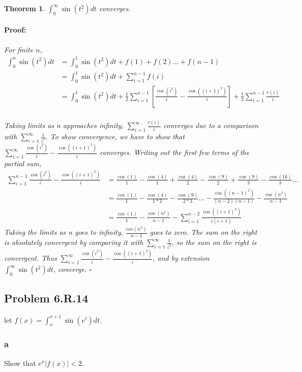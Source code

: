 \documentclass{article}
\newenvironment{proof}{\paragraph{Proof:}}{\hfill$\square$}
\newtheorem{theorem}{Theorem}
\begin{document}
\begin{theorem}
$\int_0^\infty \sin(t^2)dt$ converges.

\begin{proof}
For finite $n$,
\begin{align*}
\int_0^n \sin(t^2)dt &= \int_0^1 \sin(t^2)dt + f(1) + f(2) \dots + f(n-1) \\
&= \int_0^1 \sin(t^2)dt + \sum_{i=1}^{n-1}f(i) \\
&= \int_0^1 \sin(t^2)dt + \frac{1}{2}\sum_{i=1}^{n-1}\left[
\frac{\cos(i^2)}{i} - \frac{\cos\left((i+1)^2\right)}{i} \right]
+ \frac{1}{2}\sum_{i=1}^{n-1} \frac{r(i)}{i}
 \\
\end{align*}

Taking limits as n approaches infinity, $\sum_{i=1}^\infty \frac{r(i)}{i}$ converges due to a comparison with $\sum_{i=1}^\infty \frac{1}{i^2}$. To show convergence, we have to show that $\sum_{i=1}^{\infty}\frac{\cos(i^2)}{i} - \frac{\cos\left((i+1)^2\right)}{i}$ converges. Writing out the first few terms of the partial sum,
\begin{align*}
\sum_{i=1}^{n-1} \frac{\cos(i^2)}{i} - \frac{\cos\left((i+1)^2\right)}{i}
&= \frac{\cos(1)}{1} - \frac{\cos(4)}{1} + \frac{\cos(4)}{2} - \frac{\cos(9)}{2} + \frac{\cos(9)}{3} - \frac{\cos(16)}{3} \dots \\
&= \frac{\cos(1)}{1} - \frac{\cos(4)}{1*2} - \frac{\cos(9)}{2*3} \dots
- \frac{\cos\left((n-1)^2\right)}{(n-2)(n-1)} - \frac{\cos(n^2)}{n-1} \\
&= \frac{\cos(1)}{1} - \frac{\cos(n^2)}{n-1} 
- \sum_{i=1}^{n-2} \frac{\cos\left((i+1)^2\right)}{i(i+1)}
\end{align*}
Taking the limits as n goes to infinity, $\frac{cos(n^2)}{n-1}$ goes to zero. The sum on the right is absolutely convergent by comparing it with $\sum_{i=1}^\infty \frac{1}{i^2}$, so the sum on the right is convergent. Thus $\sum_{i=1}^{\infty}\frac{\cos(i^2)}{i} - \frac{\cos\left((i+1)^2\right)}{i}$, and by extension $\int_0^\infty \sin(t^2)dt$, converge.
\end{proof}
\end{theorem}

\subsection*{Problem 6.R.14}

let $f(x) = \int_x^{x+1}\sin(e^t)dt$.

\subsubsection*{a}
Show that $e^x|f(x)| < 2$.
\end{document}
